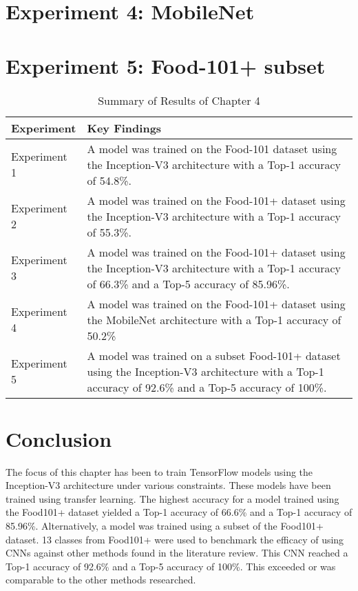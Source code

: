\section{Experiment 4: MobileNet}
\label{mobilenet}


\section{Experiment 5: Food-101+ subset}
\label{subset}


\begin{table}[]
\centering
\caption{Summary of Results of Chapter 4}
\label{my-label}
\begin{tabular}{|p{3.5cm}|p{9cm}|}
\hline
\textbf{Experiment}                               & \textbf{Key Findings}                                                                                                                                \\ \hline
Experiment 1 & A model was trained on the Food-101 dataset using the Inception-V3 architecture with a Top-1 accuracy of 54.8\%.                                     \\ \hline
Experiment 2       & A model was trained on the Food-101+ dataset using the Inception-V3 architecture with a Top-1 accuracy of 55.3\%.                                    \\ \hline
Experiment 3       & A model was trained on the Food-101+ dataset using the Inception-V3 architecture with a Top-1 accuracy of 66.3\% and a Top-5 accuracy of 85.96\%.    \\ \hline
Experiment 4                          & A model was trained on the Food-101+ dataset using the MobileNet architecture with a Top-1 accuracy of 50.2\%                                        \\ \hline
Experiment 5              & A model was trained on a subset Food-101+ dataset using the Inception-V3 architecture with a Top-1 accuracy of 92.6\% and a Top-5 accuracy of 100\%. \\ \hline
\end{tabular}
\end{table}

\section{Conclusion}
The focus of this chapter has been to train TensorFlow models using the Inception-V3 architecture under various constraints.
These models have been trained using transfer learning.
The highest accuracy for a model trained using the Food101+ dataset yielded a Top-1 accuracy of 66.6\% and a Top-1 accuracy of 85.96\%.
Alternatively, a model was trained using a subset of the Food101+ dataset.
13 classes from Food101+ were used to benchmark the efficacy of using CNNs against other methods found in the literature review.
This CNN reached a Top-1 accuracy of 92.6\% and a Top-5 accuracy of 100\%.
This exceeded or was comparable to the other methods researched.

